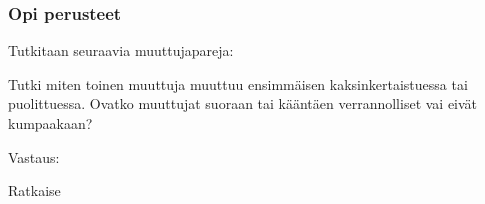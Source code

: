 \begin{tehtavasivu}

\subsubsection*{Opi perusteet}

\begin{tehtava}
    Tutkitaan seuraavia muuttujapareja:
    \begin{alakohdat}
    \end{alakohdat}
    Tutki miten toinen muuttuja muuttuu ensimmäisen kaksinkertaistuessa tai puolittuessa. Ovatko muuttujat suoraan tai kääntäen verrannolliset vai eivät kumpaakaan?
    \begin{vastaus}
        Vastaus:
        \begin{alakohdat}
        \end{alakohdat}
    \end{vastaus}
\end{tehtava}

\begin{tehtava}
Ratkaise
\begin{alakohdat}
\end{alakohdat}
\begin{vastaus}
\begin{alakohdat}
\end{alakohdat}
\end{vastaus}
\end{tehtava}


\end{tehtavasivu}
